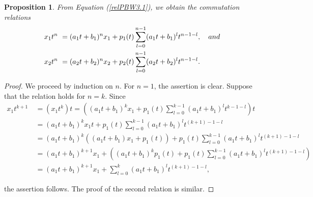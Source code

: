 \documentclass{amsart}
\newtheorem{proposition}[theorem]{Proposition}
\theoremstyle{definition}
\theoremstyle{remark}
\numberwithin{equation}{section}
\begin{document}
\begin{proposition}\label{commrel}
    From Equation {\rm (}\ref{relPBW3.1}{\rm )}, we obtain the commutation relations
    \begin{align*}
        x_1t^n &\ =(a_1t+b_1)^nx_1+p_1(t)\displaystyle\sum_{l=0}^{n-1}(a_1t+b_1)^lt^{n-1-l},\quad {\rm and} \\
        x_2t^n &\ =(a_2t+b_2)^nx_2+p_2(t)\displaystyle\sum_{l=0}^{n-1}(a_2t+b_2)^lt^{n-1-l}. 
    \end{align*}
\end{proposition}
\begin{proof} We proceed by induction on $n$. For $n=1$, the assertion is clear. Suppose that the relation holds for $n=k$. Since
\begin{align*}
    x_1t^{k+1}&\ =(x_1t^k)t =\left((a_1t+b_1)^kx_1+p_1(t)\displaystyle\sum_{l=0}^{k-1}(a_1t+b_1)^lt^{k-1-l}\right)t \\
    &\ = (a_1t+b_1)^kx_1t+p_1(t)\displaystyle\sum_{l=0}^{k-1}(a_1t+b_1)^lt^{(k+1)-1-l} \\
    &\ = (a_1t+b_1)^k((a_1t+b_1)x_1+p_1(t))+p_1(t)\displaystyle\sum_{l=0}^{k-1}(a_1t+b_1)^lt^{(k+1)-1-l} \\
    &\ = (a_1t+b_1)^{k+1}x_1+\left((a_1t+b_1)^kp_1(t)+p_1(t)\displaystyle\sum_{l=0}^{k-1}(a_1t+b_1)^lt^{(k+1)-1-l}\right) \\
    &\ = (a_1t+b_1)^{k+1}x_1+\sum_{l=0}^{k}(a_1t+b_1)^lt^{(k+1)-1-l},
\end{align*}

the assertion follows. The proof of the second relation is similar.
\end{proof}
\end{document}
